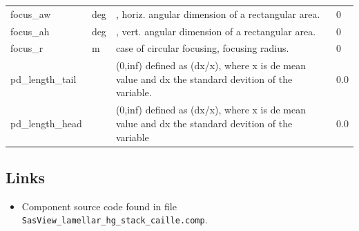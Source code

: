 \begin{longtable}{p{}p{}p{}p{}}
focus\_aw & deg & , horiz. angular dimension of a rectangular area. & 0 \\
focus\_ah & deg & , vert. angular dimension of a rectangular area. & 0 \\
focus\_r & m & case of circular focusing, focusing radius. & 0 \\
pd\_length\_tail &  & (0,inf) defined as (dx/x), where x is de mean value and dx the standard devition of the variable. & 0.0 \\
pd\_length\_head &  & (0,inf) defined as (dx/x), where x is de mean value and dx the standard devition of the variable & 0.0 \\
\bottomrule
\end{longtable}

\subsection*{Links}
\begin{itemize}
  \item Component source code found in file \texttt{SasView\_lamellar\_hg\_stack\_caille.comp}.
\end{itemize}
